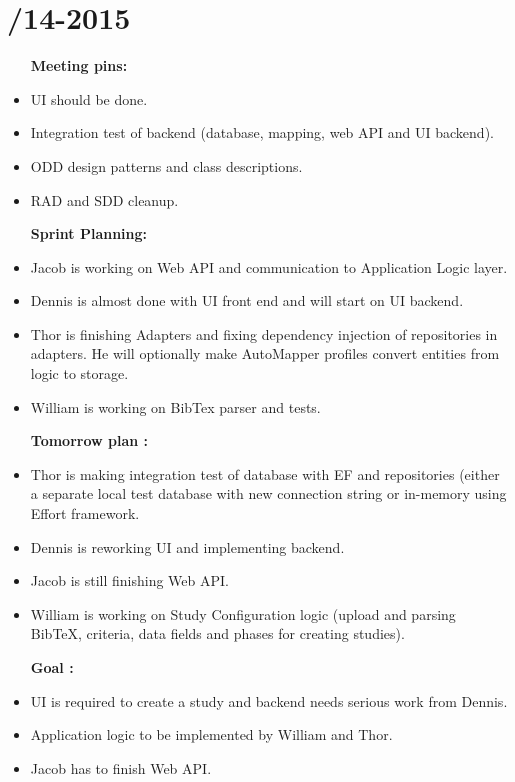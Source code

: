 \section{/14-2015} %
\attend{\at}{\at}{\at}{\at}


\begin{itemize}
	\item [\textbf{Meeting pins:}]
	\item UI should be done.
	\item Integration test of backend (database, mapping, web API and UI backend).
	\item ODD design patterns and class descriptions. 
	\item RAD and SDD cleanup. 
\end{itemize}

\begin{itemize}
	\item [\textbf{Sprint Planning:}]
	\item Jacob is working on Web API and communication to Application Logic layer.
	\item Dennis is almost done with UI front end and will start on UI backend. 
	\item Thor is finishing Adapters and fixing dependency injection of repositories in adapters. He will optionally make AutoMapper profiles convert entities from logic to storage. 
	\item William is working on BibTex parser and tests. 
\end{itemize}

\begin{itemize}
	\item [\textbf{Tomorrow plan :}]
	\item Thor is making integration test of database with EF and repositories (either a separate local test database with new connection string or in-memory using Effort framework. 
	\item Dennis is reworking UI and implementing backend. 
	\item Jacob is still finishing Web API. 
	\item William is working on Study Configuration logic (upload and parsing BibTeX, criteria, data fields and phases for creating studies). 
\end{itemize}

\begin{itemize}
	\item[\textbf{Goal : }]
	\item UI is required to create a study and backend needs serious work from Dennis.
	\item Application logic to be implemented by William and Thor. 
	\item Jacob has to finish Web API. 
\end{itemize}